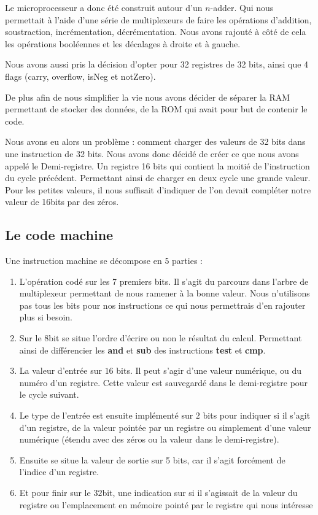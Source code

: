 \documentclass[10pt,a4paper,notitlepage ]{article}
\begin{document}
		Le microprocesseur a donc été construit autour d'un $n$-adder. Qui nous permettait à l'aide d'une série de multiplexeurs de faire les opérations d'addition, soustraction, incrémentation, décrémentation. Nous avons rajouté à côté de cela les opérations booléennes et les décalages à droite et à gauche.

		Nous avons aussi pris la décision d'opter pour 32 registres de 32 bits, ainsi que 4 flags (carry, overflow, isNeg et notZero).

		De plus afin de nous simplifier la vie nous avons décider de séparer la RAM permettant de stocker des données, de la ROM qui avait pour but de contenir le code.

		Nous avons eu alors un problème : comment charger des valeurs de 32 bits dans une instruction de 32 bits. Nous avons donc décidé de créer ce que nous avons appelé le Demi-registre. Un registre 16 bits qui contient la moitié de l'instruction du cycle précédent. Permettant ainsi de charger en deux cycle une grande valeur. Pour les petites valeurs, il nous suffisait d'indiquer de l'on devait compléter notre valeur de 16bits par des zéros.

		\subsection{Le code machine}

		Une instruction machine se décompose en 5 parties : 
		\begin{enumerate}
			\item L'opération codé sur les 7 premiers bits. Il s'agit du parcours dans l'arbre de multiplexeur permettant de nous ramener à la bonne valeur. Nous n'utilisons pas tous les bits pour nos instructions ce qui nous permettrais d'en rajouter plus si besoin.

			\item Sur le $8$\ieme bit se situe l'ordre d'écrire ou non le résultat du calcul. Permettant ainsi de différencier les \textbf{and} et \textbf{sub} des instructions \textbf{test} et \textbf{cmp}.

			\item La valeur d'entrée sur $16$ bits. Il peut s'agir d'une valeur numérique, ou du numéro d'un registre. Cette valeur est sauvegardé dans le demi-registre pour le cycle suivant.

			\item Le type de l'entrée est ensuite implémenté sur $2$ bits pour indiquer si il s'agit d'un registre, de la valeur pointée par un registre ou simplement d'une valeur numérique (étendu avec des zéros ou la valeur dans le demi-registre).

			\item Ensuite se situe la valeur de sortie sur 5 bits, car il s'agit forcément de l'indice d'un registre.

			\item Et pour finir sur le $32$\ieme bit, une indication sur si il s'agissait de la valeur du registre ou l'emplacement en mémoire pointé par le registre qui nous intéresse
		\end{enumerate}
\end{document}
